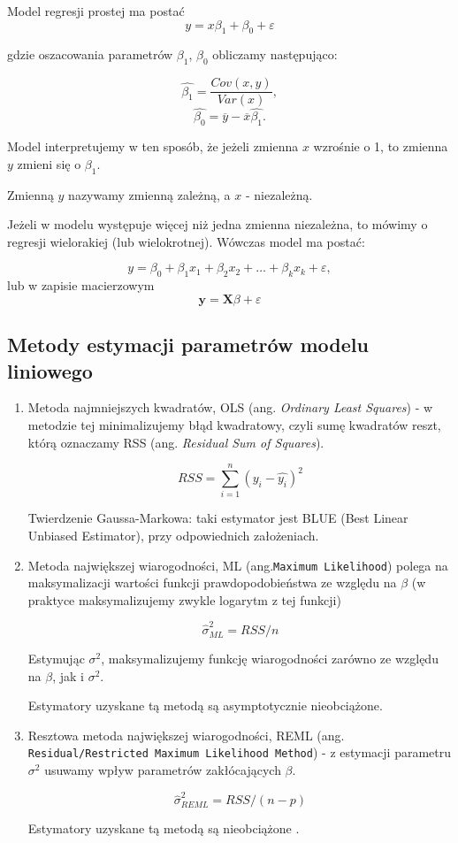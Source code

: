\documentclass[12pt]{mwbk}
\theoremstyle{plain}
\theoremstyle{definition}
\theoremstyle{remark}
\newcommand{\yy}{\mathbf{y}}
\begin{document}
Model regresji prostej ma postać 
$$y=x \beta_1+\beta_0 + \varepsilon$$

gdzie oszacowania parametrów $\beta_1$, $\beta_0$ obliczamy następująco:

$$\hat{\beta_1}=\frac{Cov(x,y)}{Var(x)},$$
$$\hat{\beta_0}=\overline{y}-\overline{x}\hat{\beta_1}.$$

Model interpretujemy w ten sposób, że jeżeli zmienna $x$ wzrośnie o 1, to zmienna $y$ zmieni się o $\beta_1$.

Zmienną $y$ nazywamy zmienną zależną, a $x$ - niezależną.

Jeżeli w modelu występuje więcej niż jedna zmienna niezależna, to mówimy o regresji wielorakiej (lub wielokrotnej). Wówczas model ma postać:

$$y=\beta_0+\beta_1 x_1+\beta_2 x_2 + \ldots + \beta_k x_k + \varepsilon,$$
lub w zapisie macierzowym
$$\yy=\mathbf{X}\beta+\varepsilon$$
\subsection{Metody estymacji parametrów modelu liniowego}
\begin{enumerate}
	\item Metoda najmniejszych kwadratów, OLS (ang. \emph{Ordinary Least Squares}) - w metodzie tej minimalizujemy błąd kwadratowy, czyli sumę kwadratów reszt, którą oznaczamy RSS (ang. \emph{Residual Sum of Squares}).
	
	$$RSS= \sum_{i=1}^{n}(y_i-\hat{y_i})^2$$
	
	Twierdzenie Gaussa-Markowa: taki estymator jest BLUE (Best Linear Unbiased Estimator), przy odpowiednich założeniach.
	
	\item Metoda największej wiarogodności, ML (ang.\texttt{Maximum Likelihood}) polega na maksymalizacji wartości funkcji prawdopodobieństwa ze względu na $\beta$ (w praktyce maksymalizujemy zwykle logarytm z tej funkcji)
	
	$$\hat{\sigma}^{2}_{ML}=RSS/n$$
	
	Estymując $\sigma^2$, maksymalizujemy funkcję wiarogodności zarówno ze względu na $\beta$, jak i $\sigma^2$.
	
	Estymatory uzyskane tą metodą są asymptotycznie nieobciążone.
	
	\item Resztowa metoda największej wiarogodności, REML (ang. \texttt{Residual/Restricted Maximum Likelihood Method}) - z estymacji parametru $\sigma^2$ usuwamy wpływ parametrów zakłócających $\beta$.
	
	$$\hat{\sigma}^2_{REML}=RSS/(n-p)$$
	
	Estymatory uzyskane tą metodą są nieobciążone \cite{biecek}.
\end{enumerate}
\end{document}
